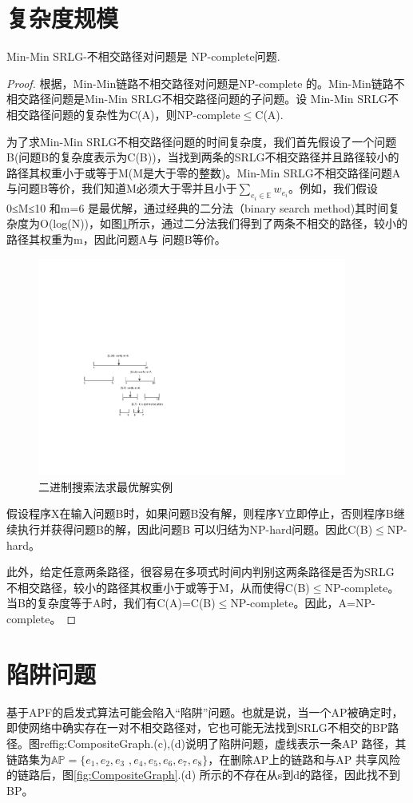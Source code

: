 \section{复杂度规模}
\begin{theorem}
\label{le:lemma1}
    Min-Min SRLG-不相交路径对问题是 NP-complete问题.
\end{theorem}
\begin{proof}
根据\cite{bhatia2006finding}，Min-Min链路不相交路径对问题是NP-complete 的。Min-Min链路不相交路径问题是Min-Min SRLG不相交路径问题的子问题。设
Min-Min SRLG不相交路径问题的复杂性为C(A)，则NP-complete$\leq$C(A).

为了求Min-Min SRLG不相交路径问题的时间复杂度，我们首先假设了一个问题B(问题B的复杂度表示为C(B))，当找到两条的SRLG不相交路径并且路径较小的路径其权重小于或等于M(M是大于零的整数)。Min-Min SRLG不相交路径问题A 与问题B等价，我们知道M必须大于零并且小于$\sum\limits_{e_i\in \mathbb{E}}w_{e_i}$。例如，我们假设0≤M≤10 和m=6 是最优解，通过经典的二分法（binary search method)其时间复杂度为O(log(N))，如图\ref{fig:binarySearch}所示，通过二分法我们得到了两条不相交的路径，较小的路径其权重为m，因此问题A与 问题B等价。
\begin{figure}[htbp]
  \centering
  \includegraphics[width=4.0in]{figures/binarySearch}
  \caption{二进制搜索法求最优解实例}
  \label{fig:binarySearch}
\end{figure}
假设程序X在输入问题B时，如果问题B没有解，则程序Y立即停止，否则程序B继续执行并获得问题B的解，因此问题B 可以归结为NP-hard问题。因此C(B)$\leq$NP-hard。

此外，给定任意两条路径，很容易在多项式时间内判别这两条路径是否为SRLG 不相交路径，较小的路径其权重小于或等于M，从而使得C(B)$\leq$NP-complete。 当B的复杂度等于A时，我们有C(A)=C(B)$\leq$NP-complete。因此，A=NP-complete。
\end{proof}
\section{陷阱问题}
\label{sec:trapproblem}
基于APF的启发式算法可能会陷入“陷阱”问题。也就是说，当一个AP被确定时，即使网络中确实存在一对不相交路径对，它也可能无法找到SRLG不相交的BP路径。图ref{fig:CompositeGraph}.(c),(d)说明了陷阱问题，虚线表示一条AP 路径，其链路集为$\mathbb{AP}=\{e_1,e_2,e_3$ $,e_4,e_5,e_6,e_7,e_8\}$，在删除AP上的链路和与AP 共享风险的链路后，图\ref{fig:CompositeGraph}.(d) 所示的不存在从s到d的路径，因此找不到BP。

